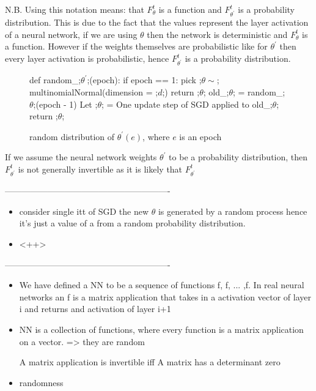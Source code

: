 N.B. Using this notation means: that $F_\theta^t$ is a function and
$F_{\theta^\prime}^t$ is a probability distribution. This is due to the fact
that the values represent the layer activation of a neural network, if we are
using $\theta$ then the network is deterministic and $F_\theta^t$ is a function.
However if the weights themselves are probabilistic like for $\theta^\prime$
then every layer activation is probabilistic, hence $F_{\theta^\prime}^t$ is a
probability distribution.

\begin{figure}[H]
    \begin{pythonfigure}
      def random_;$\theta^\prime$;(epoch):
        if epoch == 1:
          pick ;$\theta \sim$; multinomialNormal(dimension = ;$d$;)
          return ;$\theta$;
        old_;$\theta$; = random_;$\theta$;(epoch - 1)
        Let ;$\theta$; = One update step of SGD applied to old_;$\theta$;
        return ;$\theta$;

    \end{pythonfigure}
    \caption{random distribution of $\theta^\prime(e)$, where $e$ is an epoch}
    \label{fig:randomTheta}
\end{figure}

If we assume the neural network weights $\theta^\prime$ to be a probability
distribution, then $F_{\theta^\prime}^t$ is not generally invertible as it is
likely that $F_{\theta^\prime}^t$

----------------------------------------------------------

\begin{itemize}
  \item{
      consider single itt of SGD the new $\theta$ is generated by a random
      process hence it's just a value of a from a random probability
      distribution.
    }
  \item{
      <++>
    }
\end{itemize}

----------------------------------------------------------

\begin{itemize}
  \item{
      We have defined a NN to be a sequence of functions f, f, ... ,f. In real
      neural networks an f is a matrix application that takes in a activation
      vector of layer i and returns and activation of layer i+1
    }
  \item{
      NN is a collection of functions, where every function is a matrix
      application on a vector. => they are random 

      A matrix application is invertible iff A matrix has a determinant zero
    }
  \item{
      randomness
    }
\end{itemize}

